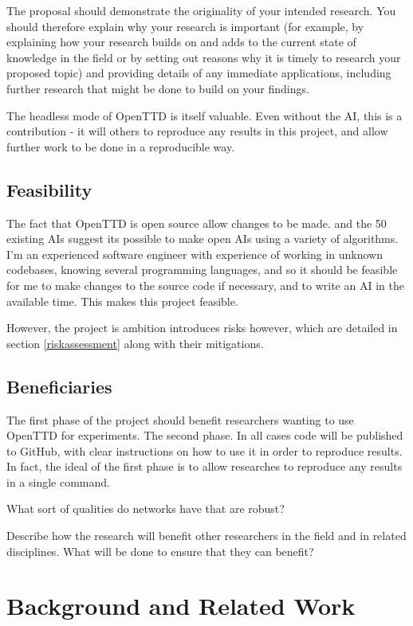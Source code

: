 \documentclass[a4paper,11pt]{article}
\begin{document}
The proposal should demonstrate the originality of your intended research. You should therefore explain why your research is important (for example, by explaining how your research builds on and adds to the current state of knowledge in the field or by setting out reasons why it is timely to research your proposed topic) and providing details of any immediate applications, including further research that might be done to build on your findings.

The headless mode of OpenTTD is itself valuable. Even without the AI, this is a contribution - it will others to reproduce any results in this project, and allow further work to be done in a reproducible way.

\subsection{Feasibility}

The fact that OpenTTD is open source allow changes to be made. and the 50 existing AIs suggest its possible to make open AIs using a variety of algorithms. I'm an experienced software engineer with experience of working in unknown codebases, knowing several programming languages, and so it should be feasible for me to make changes to the source code if necessary, and to write an AI in the available time. This makes this project feasible.

However, the project is ambition introduces risks however, which are detailed in section \ref{riskassessment} along with their mitigations.

\subsection{Beneficiaries}

The first phase of the project should benefit researchers wanting to use OpenTTD for experiments. The second phase. In all cases code will be published to GitHub, with clear instructions on how to use it in order to reproduce results. In fact, the ideal of the first phase is to allow researches to reproduce any results in a single command.

What sort of qualities do networks have that are robust?

Describe how the research will benefit other researchers in the field and in related disciplines. What will be done to ensure that they can benefit? 

\section{Background and Related Work}
\end{document}
